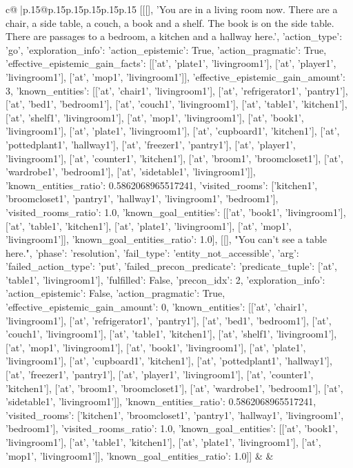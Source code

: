 \documentclass{article}
\begin{document}
{\begin{supertabular}{c@{$\;$}|p{.15\linewidth}@{}p{.15\linewidth}p{.15\linewidth}p{.15\linewidth}p{.15\linewidth}p{.15\linewidth}}
{{{	 [[[], 'You are in a living room now. There are a chair, a side table, a couch, a book and a shelf. The book is on the side table. There are passages to a bedroom, a kitchen and a hallway here.', {'action_type': 'go', 'exploration_info': {'action_epistemic': True, 'action_pragmatic': True, 'effective_epistemic_gain_facts': [['at', 'plate1', 'livingroom1'], ['at', 'player1', 'livingroom1'], ['at', 'mop1', 'livingroom1']], 'effective_epistemic_gain_amount': 3, 'known_entities': [['at', 'chair1', 'livingroom1'], ['at', 'refrigerator1', 'pantry1'], ['at', 'bed1', 'bedroom1'], ['at', 'couch1', 'livingroom1'], ['at', 'table1', 'kitchen1'], ['at', 'shelf1', 'livingroom1'], ['at', 'mop1', 'livingroom1'], ['at', 'book1', 'livingroom1'], ['at', 'plate1', 'livingroom1'], ['at', 'cupboard1', 'kitchen1'], ['at', 'pottedplant1', 'hallway1'], ['at', 'freezer1', 'pantry1'], ['at', 'player1', 'livingroom1'], ['at', 'counter1', 'kitchen1'], ['at', 'broom1', 'broomcloset1'], ['at', 'wardrobe1', 'bedroom1'], ['at', 'sidetable1', 'livingroom1']], 'known_entities_ratio': 0.5862068965517241, 'visited_rooms': ['kitchen1', 'broomcloset1', 'pantry1', 'hallway1', 'livingroom1', 'bedroom1'], 'visited_rooms_ratio': 1.0, 'known_goal_entities': [['at', 'book1', 'livingroom1'], ['at', 'table1', 'kitchen1'], ['at', 'plate1', 'livingroom1'], ['at', 'mop1', 'livingroom1']], 'known_goal_entities_ratio': 1.0}}], [[], "You can't see a table here.", {'phase': 'resolution', 'fail_type': 'entity_not_accessible', 'arg': {'failed_action_type': 'put', 'failed_precon_predicate': {'predicate_tuple': ['at', 'table1', 'livingroom1'], 'fulfilled': False, 'precon_idx': 2}}, 'exploration_info': {'action_epistemic': False, 'action_pragmatic': True, 'effective_epistemic_gain_amount': 0, 'known_entities': [['at', 'chair1', 'livingroom1'], ['at', 'refrigerator1', 'pantry1'], ['at', 'bed1', 'bedroom1'], ['at', 'couch1', 'livingroom1'], ['at', 'table1', 'kitchen1'], ['at', 'shelf1', 'livingroom1'], ['at', 'mop1', 'livingroom1'], ['at', 'book1', 'livingroom1'], ['at', 'plate1', 'livingroom1'], ['at', 'cupboard1', 'kitchen1'], ['at', 'pottedplant1', 'hallway1'], ['at', 'freezer1', 'pantry1'], ['at', 'player1', 'livingroom1'], ['at', 'counter1', 'kitchen1'], ['at', 'broom1', 'broomcloset1'], ['at', 'wardrobe1', 'bedroom1'], ['at', 'sidetable1', 'livingroom1']], 'known_entities_ratio': 0.5862068965517241, 'visited_rooms': ['kitchen1', 'broomcloset1', 'pantry1', 'hallway1', 'livingroom1', 'bedroom1'], 'visited_rooms_ratio': 1.0, 'known_goal_entities': [['at', 'book1', 'livingroom1'], ['at', 'table1', 'kitchen1'], ['at', 'plate1', 'livingroom1'], ['at', 'mop1', 'livingroom1']], 'known_goal_entities_ratio': 1.0}}]] 
	  } 
	   } 
	   } 
	 & & \\ 
 


\end{supertabular}}
\end{document}
